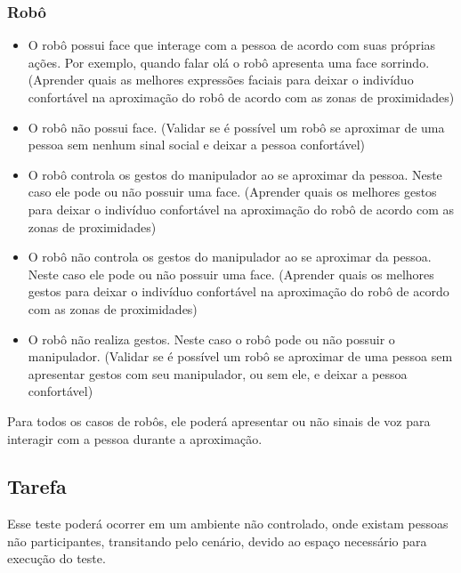 \subsubsection{Robô}

\begin{itemize}
	\item O robô possui face que interage com a pessoa de acordo com suas próprias ações. Por exemplo, quando falar olá o robô apresenta uma face sorrindo. (Aprender quais as melhores expressões faciais para deixar o indivíduo confortável na aproximação do robô de acordo com as zonas de proximidades)
	\item O robô não possui face. (Validar se é possível um robô se aproximar de uma pessoa sem nenhum sinal social e deixar a pessoa confortável)
	\item O robô controla os gestos do manipulador ao se aproximar da pessoa. Neste caso ele pode ou não possuir uma face. (Aprender quais os melhores gestos para deixar o indivíduo confortável na aproximação do robô de acordo com as zonas de proximidades)
	\item O robô não controla os gestos do manipulador ao se aproximar da pessoa. Neste caso ele pode ou não possuir uma face. (Aprender quais os melhores gestos para deixar o indivíduo confortável na aproximação do robô de acordo com as zonas de proximidades)
	\item O robô não realiza gestos. Neste caso o robô pode ou não possuir o manipulador. (Validar se é possível um robô se aproximar de uma pessoa sem apresentar gestos com seu manipulador, ou sem ele, e deixar a pessoa confortável)
\end{itemize}

Para todos os casos de robôs, ele poderá apresentar ou não sinais de voz para interagir com a pessoa durante a aproximação.

\subsection{Tarefa}

Esse teste poderá ocorrer em um ambiente não controlado, onde existam pessoas não participantes, transitando pelo cenário, devido ao espaço necessário para execução do teste.

